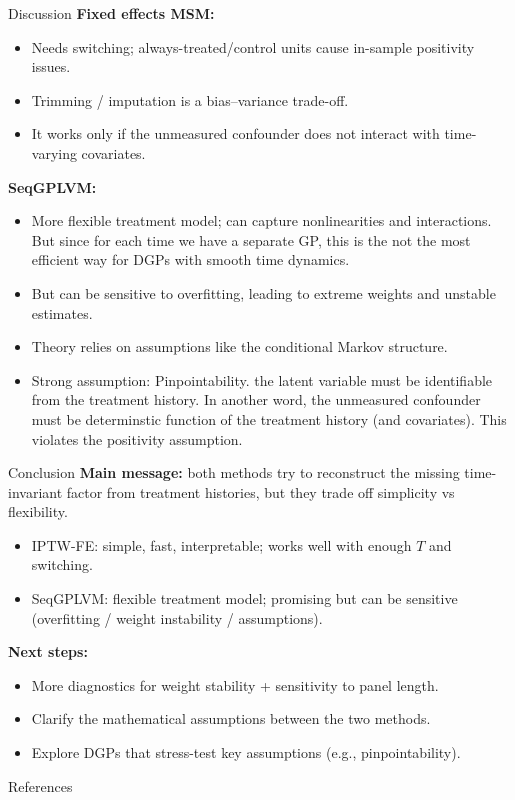 \documentclass[aspectratio=169]{beamer}
\begin{document}
\begin{frame}{Discussion}
\textbf{Fixed effects MSM:}
\begin{itemize}
  \item Needs switching; always-treated/control units cause in-sample positivity issues.
  \item Trimming / imputation is a bias--variance trade-off.
  \item It works only if the unmeasured confounder does not interact with time-varying covariates. 
\end{itemize}

\vspace{0.2cm}
\textbf{SeqGPLVM:}
\begin{itemize}
  \item More flexible treatment model; can capture nonlinearities and interactions. But since for each time we have a separate GP, this is the not the most efficient way for DGPs with smooth time dynamics.
  \item But can be sensitive to overfitting, leading to extreme weights and unstable estimates.
  \item Theory relies on assumptions like the conditional Markov structure.
  \item Strong assumption: Pinpointability. the latent variable must be identifiable from the treatment history. In another word, 
  the unmeasured confounder must be determinstic function of the treatment history (and covariates). This violates the positivity assumption. 
\end{itemize}
\end{frame}

\begin{frame}{Conclusion}
\textbf{Main message:} both methods try to reconstruct the missing time-invariant factor from treatment histories,
but they trade off simplicity vs flexibility.

\vspace{0.2cm}
\begin{itemize}
  \item IPTW-FE: simple, fast, interpretable; works well with enough $T$ and switching.
  \item SeqGPLVM: flexible treatment model; promising but can be sensitive (overfitting / weight instability / assumptions).
\end{itemize}

\vspace{0.3cm}
\textbf{Next steps:}
\begin{itemize}
  \item More diagnostics for weight stability + sensitivity to panel length.
  \item Clarify the mathematical assumptions between the two methods.
  \item Explore DGPs that stress-test key assumptions (e.g., pinpointability).
\end{itemize}
\end{frame}

\appendix
\begin{frame}[allowframebreaks]{References}

\end{frame}
\end{document}
